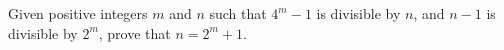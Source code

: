 \problem{}
Given positive integers $m$ and $n$ such that $4^m - 1$ is divisible by $n$, and $n - 1$ is divisible by $2^m$, prove that $n = 2^m + 1$.
\solution
\endproblem
